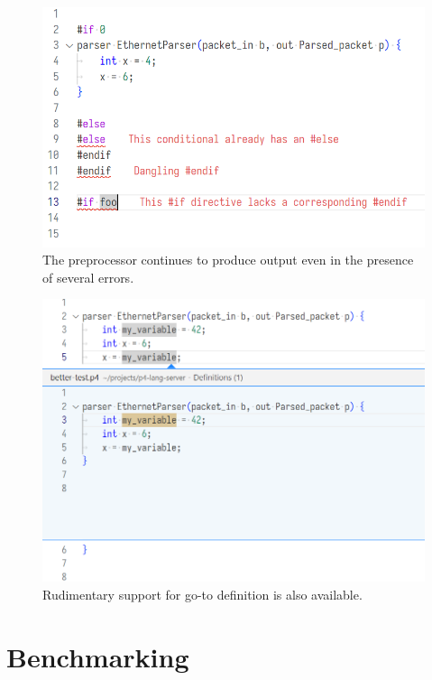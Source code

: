 \begin{figure}[t]
	\centering
	\includegraphics[width=\textwidth]{resources/p4analyzer-preprocessor-errors.png}
	\caption{The preprocessor continues to produce output even in the presence
	of several errors.}
	\label{fig:preprocessor-errors}
\end{figure}


\begin{figure}[t]
	\centering
	\includegraphics[width=\textwidth]{resources/p4analyzer-goto-definition.png}
	\caption{Rudimentary support for go-to definition is also available.}
	\label{fig:goto-def}
\end{figure}

\section{Benchmarking}

